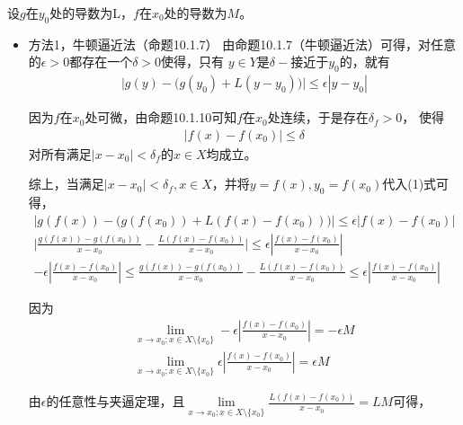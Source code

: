 \documentclass{article}
\begin{document}
设$g$在$y_0$处的导数为L，$f$在$x_0$处的导数为$M$。
\begin{itemize}
  \item 方法1，牛顿逼近法（命题10.1.7）
        由命题10.1.7（牛顿逼近法）可得，对任意的$\epsilon > 0$都存在一个$\delta > 0$使得，只有
        $y \in Y$是$\delta-$接近于$y_0$的，就有
        \begin{align}
          \big| g(y) - \big(g(y_0) + L(y - y_0) \big) \big| \leq \epsilon|y - y_0|
        \end{align}

        因为$f$在$x_0$处可微，由命题10.1.10可知$f$在$x_0$处连续，于是存在$\delta_f > 0$，
        使得
        \begin{align*}
          |f(x) - f(x_0)| \leq \delta
        \end{align*}
        对所有满足$|x - x_0| < \delta_f$的$x \in X$均成立。

        综上，当满足$|x - x_0| < \delta_f, x \in X$，并将$y = f(x), y_0 = f(x_0)$代入(1)式可得，
        \begin{align*}
          \big| g(f(x)) - \big(g(f(x_0)) + L(f(x) - f(x_0)) \big) \big| \leq \epsilon|f(x) - f(x_0)|                                       \\
          \big| \frac{g(f(x)) - g(f(x_0))}{x - x_0} - \frac{L(f(x) - f(x_0))}{x - x_0}  \big| \leq \epsilon|\frac{f(x) - f(x_0)}{x - x_0}| \\
          - \epsilon|\frac{f(x) - f(x_0)}{x - x_0}| \leq \frac{g(f(x)) - g(f(x_0))}{x - x_0} - \frac{L(f(x) - f(x_0))}{x - x_0} \leq \epsilon|\frac{f(x) - f(x_0)}{x - x_0}|
        \end{align*}

        因为
        \begin{align}
          \lim \limits_{x \to x_0; x \in X \setminus \{x_0\}} - \epsilon|\frac{f(x) - f(x_0)}{x - x_0}| = -\epsilon M \\
          \lim \limits_{x \to x_0; x \in X \setminus \{x_0\}} \epsilon|\frac{f(x) - f(x_0)}{x - x_0}| = \epsilon M
        \end{align}

        由$\epsilon$的任意性与夹逼定理，且$\lim \limits_{x \to x_0; x \in X \setminus \{x_0\}} \frac{L(f(x) - f(x_0))}{x - x_0} = LM$可得，


\end{itemize}
\end{document}
